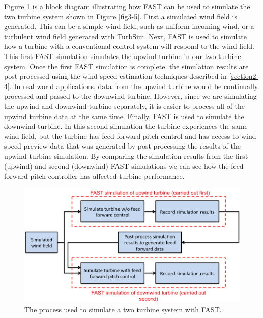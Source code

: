 Figure \ref{fig3-6} is a block diagram illustrating how FAST can be used to simulate the two turbine system shown in Figure \ref{fig3-5}. First a simulated wind field is generated. This can be a simple wind field, such as  uniform incoming wind, or a turbulent wind field generated with TurbSim. Next, FAST is used to simulate how a turbine with a conventional control system will respond to the  wind field. This first FAST simulation simulates the upwind turbine in our two turbine system. Once the first FAST simulation is complete, the simulation results are post-processed using the wind speed estimation techniques described in \ref{section2-4}. In real world applications, data from the upwind turbine would be continually processed and passed to the downwind turbine. However, since we are simulating the upwind and downwind turbine separately, it is easier to process all of the upwind turbine data at the same time. Finally, FAST is used to simulate the downwind turbine. In this second simulation the turbine experiences the same wind field, but the turbine has feed forward pitch control and has access to wind speed preview data that was generated by post processing the results of the upwind turbine simulation. By comparing the simulation results from the first (upwind) and second (downwind) FAST simulations we can see how the feed forward pitch controller has affected turbine performance.

 \begin{figure}[htb]
	\centering
		\includegraphics[width=\linewidth]{Figures/ch3Figures/fig3-6.png}
		
	\caption{The process used to simulate a two turbine system with FAST.}
	\label{fig3-6}
\end{figure}



